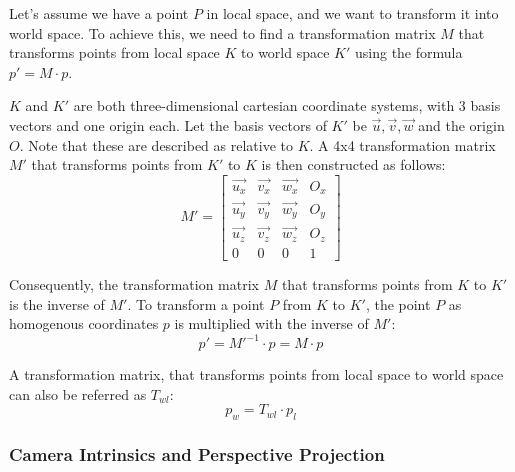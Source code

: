 Let's assume we have a point $P$ in local space, and we want to transform it into world space.
To achieve this, we need to find a transformation matrix $M$ that transforms points
from local space $K$ to world space $K'$ using the formula $p' = M\cdot p$.

$K$ and $K'$ are both three-dimensional cartesian coordinate systems, with 3 basis vectors and one origin each.
Let the basis vectors of $K'$ be $\vec{u}, \vec{v}, \vec{w}$ and the origin $O$.
Note that these are described as relative to $K$.
A 4x4 transformation matrix $M'$ that transforms points from $K'$ to $K$ is then constructed as follows:
\begin{equation}
    M' = \begin{bmatrix}
            \vec{u_x} & \vec{v_x} & \vec{w_x} & O_x \\
            \vec{u_y} & \vec{v_y} & \vec{w_y} & O_y \\
            \vec{u_z} & \vec{v_z} & \vec{w_z} & O_z \\
            0         & 0         & 0         & 1
    \end{bmatrix}
\end{equation}

Consequently, the transformation matrix $M$ that transforms points from $K$ to $K'$ is the inverse of $M'$.
To transform a point $P$ from $K$ to $K'$, the point $P$ as homogenous coordinates $p$ is multiplied with the inverse of $M'$:
\begin{equation}
    p' = M'^{-1} \cdot p = M\cdot p
\end{equation}

A transformation matrix, that transforms points from local space to world space can also be referred as $T_{wl}$:
\begin{equation}
    p_w = T_{wl} \cdot p_l
\end{equation}


\cite{dorner_virtual_2019}

\subsubsection{Camera Intrinsics and Perspective Projection}

